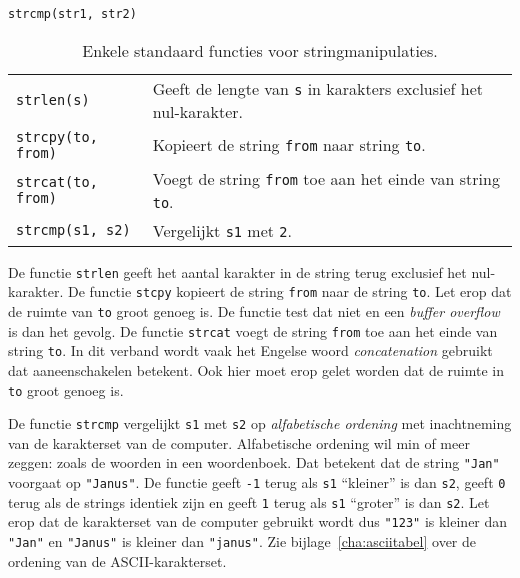 \hbox{\texttt{strcmp(str1, str2)}}
\begin{table}[!ht]
\centering
\caption{Enkele standaard functies voor stringmanipulaties.}
\label{tab:arystringmanip}
\begin{tabular}{@{}p{}l@{}}
\toprule
\texttt{strlen(s)} &  Geeft de lengte van \texttt{s} in karakters exclusief het nul-karakter.\\
\texttt{strcpy(to, from)} &  Kopieert de string \texttt{from} naar string \texttt{to}.\\
\texttt{strcat(to, from)} &  Voegt de string \texttt{from} toe aan het einde van string \texttt{to}.\\
\texttt{strcmp(s1, s2)} &  Vergelijkt \texttt{s1} met \texttt{2}.\\
\bottomrule
\end{tabular} 
\end{table}

De functie \texttt{strlen} geeft het aantal karakter in de string terug exclusief het nul-karakter. De functie \texttt{stcpy} kopieert de string \texttt{from} naar de string \texttt{to}. Let erop dat de ruimte van \texttt{to} groot genoeg is. De functie test dat niet en een \textsl{buffer overflow} is dan het gevolg. De functie \texttt{strcat} voegt de string \texttt{from} toe aan het einde van string \texttt{to}. In dit verband wordt vaak het Engelse woord \textsl{concatenation} gebruikt dat aaneenschakelen betekent. Ook hier moet erop gelet worden dat de ruimte in \texttt{to} groot genoeg is.

De functie \texttt{strcmp} vergelijkt \texttt{s1} met \texttt{s2} op \textsl{alfabetische ordening} met inachtneming van de karakterset van de computer. Alfabetische ordening wil min of meer zeggen: zoals de woorden in een woordenboek. Dat betekent dat de string \texttt{"Jan"} voorgaat op \texttt{"Janus"}. De functie geeft \texttt{-1} terug als \texttt{s1} ``kleiner'' is dan \texttt{s2}, geeft \texttt{0} terug als de strings identiek zijn en geeft \texttt{1} terug als \texttt{s1} ``groter'' is dan \texttt{s2}. Let erop dat de karakterset van de computer gebruikt wordt dus \texttt{"123"} is kleiner dan \texttt{"Jan"} en \texttt{"Janus"} is kleiner dan \texttt{"janus"}. Zie bijlage~\ref{cha:asciitabel} over de ordening van de ASCII-karakterset.


